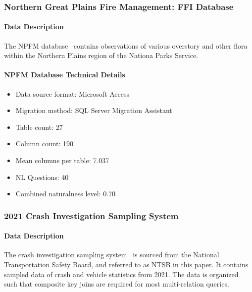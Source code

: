 \subsubsection{Northern Great Plains Fire Management: FFI Database}

\paragraph{Data Description}
The NPFM database~\cite{ngp-fire} contains observations of various overstory and other flora within the Northern Plains region of the Nationa Parks Service.


\paragraph{NPFM Database Technical Details}
\begin{itemize}
  \item Data source format: Microsoft Access
  \item Migration method: SQL Server Migration Assistant
  \item Table count: 27
  \item Column count: 190
  \item Mean columns per table: 7.037
  \item NL Questions: 40
  \item Combined naturalness level: 0.70 
\end{itemize}

\subsubsection{2021 Crash Investigation Sampling System}

\paragraph{Data Description}
The crash investigation sampling system~\cite{crash-investigation-sampling-system} is sourced from the National Transportation Safety Board, and referred to as NTSB in this paper.
It contains sampled data of crash and vehicle statistics from 2021.
The data is organized such that composite key joins are required for most multi-relation queries.

